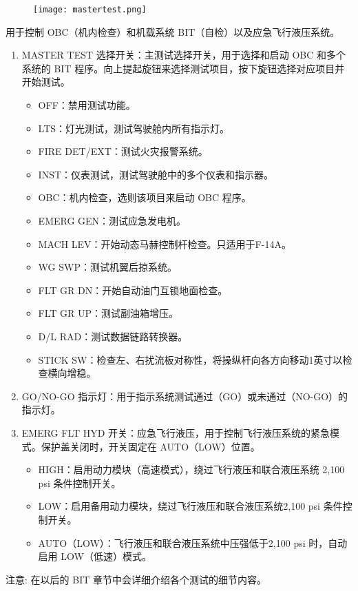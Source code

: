 \begin{figure}[htb]
  \center
  \texttt{[image: mastertest.png]}
\end{figure}

用于控制 OBC（机内检查）和机载系统 BIT（自检）以及应急飞行液压系统。

\begin{enumerate}
  \item MASTER TEST 选择开关：主测试选择开关，用于选择和启动 OBC 和多个系统的 BIT 程序。向上提起旋钮来选择测试项目，按下旋钮选择对应项目并开始测试。
  \begin{itemize}
    \item OFF：禁用测试功能。
    \item LTS：灯光测试，测试驾驶舱内所有指示灯。
    \item FIRE DET/EXT：测试火灾报警系统。
    \item INST：仪表测试，测试驾驶舱中的多个仪表和指示器。
    \item OBC：机内检查，选则该项目来启动 OBC 程序。
    \item EMERG GEN：测试应急发电机。
    \item MACH LEV：开始动态马赫控制杆检查。只适用于F-14A。
    \item WG SWP：测试机翼后掠系统。
    \item FLT GR DN：开始自动油门互锁地面检查。
    \item FLT GR UP：测试副油箱增压。
    \item D/L RAD：测试数据链路转换器。
    \item STICK SW：检查左、右扰流板对称性，将操纵杆向各方向移动1英寸以检查横向增稳。 
  \end{itemize}
  \item GO/NO-GO 指示灯：用于指示系统测试通过（GO）或未通过（NO-GO）的指示灯。
  \item EMERG FLT HYD 开关：应急飞行液压，用于控制飞行液压系统的紧急模式。保护盖关闭时，开关固定在 AUTO（LOW）位置。
  \begin{itemize}
    \item HIGH：启用动力模块（高速模式），绕过飞行液压和联合液压系统 2,100 psi 条件控制开关。
    \item LOW：启用备用动力模块，绕过飞行液压和联合液压系统2,100 psi 条件控制开关。
    \item AUTO（LOW）：飞行液压和联合液压系统中压强低于2,100 psi 时，自动启用 LOW（低速）模式。
  \end{itemize}
\end{enumerate}
注意:	在以后的 BIT 章节中会详细介绍各个测试的细节内容。

